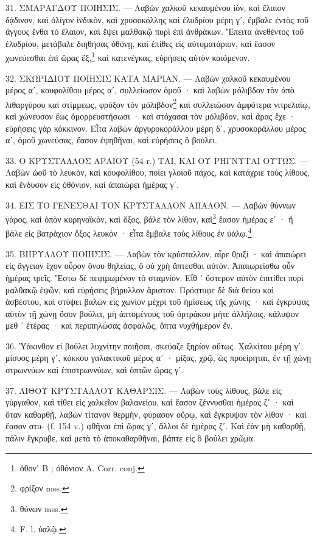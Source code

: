 \documentclass[a4paper, 11pt, oneside, polutonikogreek, french]{article}
\begin{document}
31. ΣΜΑΡΑΓΔΟΥ ΠΟΙΗΣΙΣ. --- Λαβὼν χαλκοῦ κεκαυμένου ἰὸν, καὶ ἔλαιον δᾴδινον, καὶ ὀλίγον ἰνδικὸν, καὶ χρυσοκόλλης καὶ ἐλυδρίου μέρη γʹ, ἔμβαλε ἐντὸς τοῦ ἄγγους ἔνθα τὸ ἔλαιον, καὶ ἕψει μαλθακῷ πυρὶ ἐπὶ ἀνθράκων. Ἔπειτα ἀνεθέντος τοῦ ἐλυδρίου, μετάβαλε διηθήσας ὀθόνῃ, καὶ ἐπίθες εἰς αὐτοματάριον, καὶ ἔασον χωνεύεσθαι ἐπὶ ὥρας ἓξ,\footnote{ὀθονʹ B ; ὀθόνιον A. Corr. conj.} καὶ κατενέγκας, εὑρήσεις αὐτὸν καιόμενον.

32. ΣΚΩΡΙΔΙΟΥ ΠΟΙΗΣΙΣ ΚΑΤΑ ΜΑΡΙΑΝ. --- Λαβὼν χαλκοῦ κεκαυμένου μέρος αʹ, κουφολίθου μέρος αʹ, συλλείωσον ὁμοῦ · καὶ λαβὼν μόλιβδον τὸν ἀπὸ λιθαργύρου καὶ στίμμεως, φρύξον τὸν μόλιβδον\footnote{φρίξον mss.} καὶ συλλειώσον ἀμφότερα νιτρελαίῳ, καὶ χώνευσον ἕως ὁμορρευστήσωσι · καὶ στόχασαι τὸν μόλιβδον, καὶ ἄρας ἔχε · εὑρήσεις γὰρ κόκκινον. Εἶτα λαβὼν ἀργυροκοράλλου μέρη δʹ, χρυσοκοράλλου μέρος αʹ, ὁμοῦ χωνεύσας, ἔασον ἑψηθῆναι, καὶ εὑρήσεις ὃ βούλει.

33. Ο ΚΡΥΣΤΑΛΛΟΣ ΑΡΑΙΟΥ (54 r.) ΤΑΙ, ΚΑΙ ΟΥ ΡΗΓΝΥΤΑΙ ΟΥΤΩΣ. --- Λαβὼν ὠοῦ τὸ λευκὸν, καὶ κουφολίθου, ποίει γλοιοῦ πάχος, καὶ κατάχριε τοὺς λίθους, καὶ ἔνδυσον εἰς ὀθόνιον, καὶ ἀπαιώρει ἡμέρας γʹ.

34. ΕΙΣ ΤΟ ΓΕΝΕΣΘΑΙ ΤΟΝ ΚΡΥΣΤΑΛΛΟΝ ΑΠΑΛΟΝ. --- Λαβὼν θύννων γάρος, καὶ ὀπὸν κυρηναϊκὸν, καὶ ὄξος, βάλε τὸν λίθον, καὶ\footnote{θύνων mss.} ἔασον ἡμέρας εʹ · ἢ βάλε εἰς βατράχιον ὄξος λευκόν · εἶτα ἔμβαλε τοὺς λίθους ἐν ὑάλῳ.\footnote{F. l. ὑαλῷ.}

35. ΒΗΡΥΛΛΟΥ ΠΟΙΗΣΙΣ. --- Λαβὼν τὸν κρύσταλλον, αἶρε θριξί · καὶ ἀπαιώρει εἰς ἄγγειον ἔχον οὖρον ὅνου θηλείας, ὃ οὐ χρὴ ἅπτεσθαι αὐτὸν. Ἀπαιωρείσθω οὖν ἡμέρας τρεῖς. Ἔστω δὲ πεφιμωμένον τὸ σταμνίον. Εἶθ ᾽ ὕστερον αὐτὸν ἐπιτίθει πυρὶ μαλθακῷ ἑψῶν, καὶ εὑρήσεις βήρυλλον ἄριστον. Πρόστυφε δὲ διὰ θείου καὶ ἀσβέστου, καὶ στύψει βαλὼν εἰς χωνίον μέχρι τοῦ ἡμίσεως τῆς χώνης · καὶ ἐγκρύψας αὐτὸν τῇ χώνῃ ὅσον βούλει, μὴ ἁπτομένους τοῦ ὀρτράκου μήτε ἀλλήλοις, κάλυψον μεθ ᾽ ἑτέρας · καὶ περιπηλώσας ἀσφαλῶς, ὄπτα νυχθήμερον ἕν.

36. Ὑάκινθον εἰ βούλει λυχνίτην ποιῆσαι, σκεύαζε ξηρίον οὕτως. Χαλκίτου μέρη γʹ, μίσυος μέρη γʹ, κόκκου γαλακτικοῦ μέρος αʹ · μίξας, χρῷ, ὡς προείρηται, ἐν τῇ χώνῃ στρωννύων καὶ ἐπιστρωννύων, καὶ ὀπτῶν ὥρας γʹ.

37. ΛΙΘΟΥ ΚΡΥΣΤΑΛΛΟΥ ΚΑΘΑΡΣΙΣ. --- Λαβὼν τοὺς λίθους, βάλε εἰς γύργαθον, καὶ τίθει εἰς χαλκεῖον βαλανείου, καὶ ἔασον ζέννυσθαι ἡμέρας ζʹ · καὶ ὅταν καθαρθῇ, λαβὼν τίτανον θερμὴν, φύρασον οὔρῳ, καὶ ἔγκρυψον τὸν λίθον · καὶ ἔασον στυ- (f. 154 v.) φθῆναι ἐπὶ ὥρας γʹ, ἄλλοι δὲ ἡμέρας ζʹ. Καὶ ἐὰν μὴ καθαρθῇ, πάλιν ἔγκρυβε, καὶ μετὰ τὸ ἀποκαθαρθῆναι, βάπτε εἰς ὃ βούλει χρῶμα.
\end{document}
